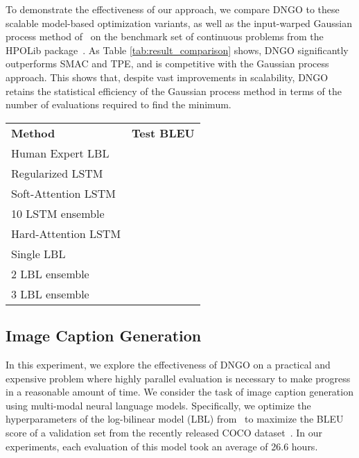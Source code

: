 \documentclass{article}
\begin{document}
To demonstrate the effectiveness of our approach, we compare DNGO to these scalable model-based optimization variants, as well as the input-warped Gaussian process method of~\citet{snoek-etal-2014a} on the benchmark set of continuous problems from the HPOLib package~\cite{Eggensperger-etal-2013a}. As Table \ref{tab:result_comparison} shows, DNGO significantly outperforms SMAC and TPE, and is competitive with the Gaussian process approach. This shows that, despite vast improvements in scalability, DNGO retains the statistical efficiency of the Gaussian process method in terms of the number of evaluations required to find the minimum.

\begin{table}[t]
  \centering
\begin{tabular}[b]{lr}
    \toprule
    {\bf Method} & {\bf Test BLEU}\\\cmidrule(r){1-2}Human Expert LBL & \\
    Regularized LSTM & \\
    Soft-Attention LSTM & \\
    10 LSTM ensemble & \\
    Hard-Attention LSTM & \\
    \cmidrule(r){1-2}Single LBL & \\
    2 LBL ensemble & \\
    3 LBL ensemble & \\
   \bottomrule \end{tabular}\captionsetup[table]{position=bottom}
  \label{tab:captionresults}
	\vspace{-13pt}
\end{table}

\subsection{Image Caption Generation}
In this experiment, we explore the effectiveness of DNGO on a practical and expensive problem where highly parallel evaluation is necessary to make progress in a reasonable amount of time.  We consider the task of image caption generation using multi-modal neural language models. Specifically, we optimize the hyperparameters of the log-bilinear model (LBL) from~\citet{kiros-etal-2014a} to maximize the BLEU score of a validation set from the recently released COCO dataset~\cite{lin2014microsoft}.  In our experiments, each evaluation of this model took an average of 26.6 hours.
\end{document}
